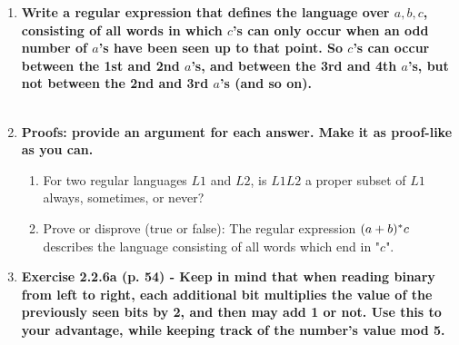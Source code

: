 \begin{enumerate}
\newpage
\item \textbf{Write a regular expression that defines the language over
  ${a,b,c}$, consisting of all words in which $c$'s can only occur when an odd
  number of $a$'s have been seen up to that point. So $c$'s can occur between the 1st and 2nd $a$'s, and between the 3rd and 4th $a$'s, but not between the 2nd and 3rd $a$'s (and so on).}
\\\\


\newpage
\item \textbf{Proofs: provide an argument for each answer. Make it as
  proof-like as you can.}
\begin{enumerate}
  \item For two regular languages $L1$ and $L2$, is $L1L2$ a proper subset of
    $L1$ always, sometimes, or never?
  \item Prove or disprove (true or false): The regular expression $(a+b){}^\ast c$
    describes the language consisting of all words which end in "$c$".
\end{enumerate}

\newpage
\item \textbf{Exercise 2.2.6a (p. 54) - Keep in mind that when reading binary
  from left to right, each additional bit multiplies the value of the
  previously seen bits by 2, and then may add 1 or not. Use this to your
  advantage, while keeping track of the number's value mod 5.}
\\\\


\end{enumerate}


